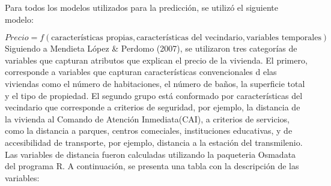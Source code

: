 \documentclass[
  11pt,
  letterpaper,
]{article}
\begin{document}
Para todos los modelos utilizados para la predicción, se utilizó el siguiente modelo:

\[
Precio= f(\text{características propias}, \text{características del vecindario},\text{variables temporales})
\]
Siguiendo a Mendieta López \& Perdomo (2007), se utilizaron tres categorías de variables que capturan atributos que explican el precio de la vivienda. El primero, corresponde a variables que capturan características convencionales d elas viviendas como el número de habitaciones, el número de baños, la superficie total y el tipo de propiedad. El segundo grupo está conformado por características del vecindario que corresponde a criterios de seguridad, por ejemplo, la distancia de la vivienda al Comando de Atención Inmediata(CAI), a criterios de servicios, como la distancia a parques, centros comeciales, instituciones educativas, y de accesibilidad de transporte, por ejemplo, distancia a la estación del transmilenio. Las variables de distancia fueron calculadas utilizando la paqueteria Osmadata del programa R. A continuación, se presenta una tabla con la descripción de las variables:
\end{document}
